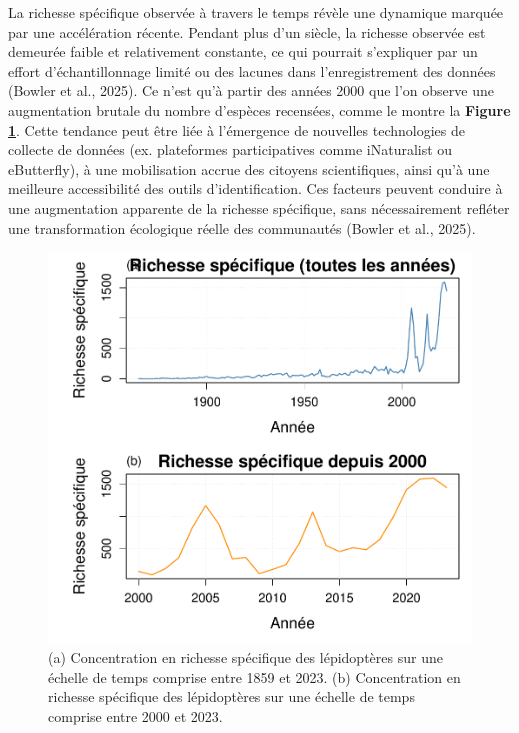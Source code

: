 \documentclass[9pt,twocolumn,twoside,]{pnas-new}
\begin{document}
La richesse spécifique observée à travers le temps révèle une dynamique
marquée par une accélération récente. Pendant plus d'un siècle, la
richesse observée est demeurée faible et relativement constante, ce qui
pourrait s'expliquer par un effort d'échantillonnage limité ou des
lacunes dans l'enregistrement des données (Bowler et al., 2025). Ce
n'est qu'à partir des années 2000 que l'on observe une augmentation
brutale du nombre d'espèces recensées, comme le montre la \textbf{Figure
\ref{fig:fig_richesse_temporelle}}. Cette tendance peut être liée à
l'émergence de nouvelles technologies de collecte de données (ex.
plateformes participatives comme iNaturalist ou eButterfly), à une
mobilisation accrue des citoyens scientifiques, ainsi qu'à une meilleure
accessibilité des outils d'identification. Ces facteurs peuvent conduire
à une augmentation apparente de la richesse spécifique, sans
nécessairement refléter une transformation écologique réelle des
communautés (Bowler et al., 2025).

\begin{figure}[H]

{\centering \includegraphics[width=0.8\linewidth]{rapport_final_BIO500_files/figure-latex/fig_richesse_temporelle-1} 

}

\caption{\label{fig:fig_richesse_temporelle}(a) Concentration en richesse spécifique des lépidoptères sur une échelle de temps comprise entre 1859 et 2023. (b) Concentration en richesse spécifique des lépidoptères sur une échelle de temps comprise entre 2000 et 2023.}\label{fig:fig_richesse_temporelle}
\end{figure}
\end{document}
